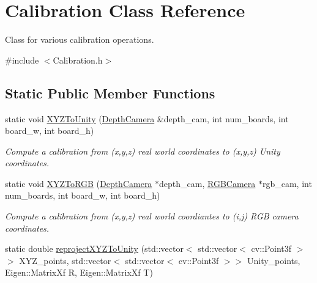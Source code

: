 \hypertarget{class_calibration}{}\section{Calibration Class Reference}
\label{class_calibration}


Class for various calibration operations.  




{\ttfamily \#include $<$Calibration.\+h$>$}

\subsection*{Static Public Member Functions}
\begin{DoxyCompactItemize}
\item 
\hypertarget{class_calibration_a81cb3c8c004042bfd86b6f973b607f67}{}\label{class_calibration_a81cb3c8c004042bfd86b6f973b607f67} 
static void \hyperlink{class_calibration_a81cb3c8c004042bfd86b6f973b607f67}{X\+Y\+Z\+To\+Unity} (\hyperlink{class_depth_camera}{Depth\+Camera} \&depth\+\_\+cam, int num\+\_\+boards, int board\+\_\+w, int board\+\_\+h)
\begin{DoxyCompactList}\small\item\em Compute a calibration from (x,y,z) real world coordinates to (x\textquotesingle{},y\textquotesingle{},z\textquotesingle{}) Unity coordinates. \end{DoxyCompactList}\item 
\hypertarget{class_calibration_ae686271805ffbaa32e0d8b796ae8d466}{}\label{class_calibration_ae686271805ffbaa32e0d8b796ae8d466} 
static void \hyperlink{class_calibration_ae686271805ffbaa32e0d8b796ae8d466}{X\+Y\+Z\+To\+R\+GB} (\hyperlink{class_depth_camera}{Depth\+Camera} $\ast$depth\+\_\+cam, \hyperlink{class_r_g_b_camera}{R\+G\+B\+Camera} $\ast$rgb\+\_\+cam, int num\+\_\+boards, int board\+\_\+w, int board\+\_\+h)
\begin{DoxyCompactList}\small\item\em Compute a calibration from (x,y,z) real world coordiantes to (i,j) R\+GB camera coordinates. \end{DoxyCompactList}\item 
static double \hyperlink{class_calibration_ac69c3f4ad6231d799e7b3d644acf1dcf}{reproject\+X\+Y\+Z\+To\+Unity} (std\+::vector$<$ std\+::vector$<$ cv\+::\+Point3f $>$$>$ X\+Y\+Z\+\_\+points, std\+::vector$<$ std\+::vector$<$ cv\+::\+Point3f $>$$>$ Unity\+\_\+points, Eigen\+::\+Matrix\+Xf R, Eigen\+::\+Matrix\+Xf T)

\end{DoxyCompactItemize}
